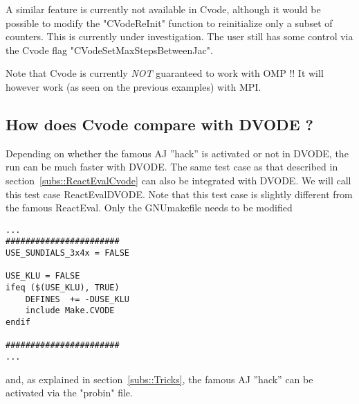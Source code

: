 \documentclass[12pt]{article}
\begin{document}
A similar feature is currently not available in Cvode, although it would be possible to modify the "CVodeReInit" function to reinitialize only a subset of counters. This is currently under investigation. The user still has some control via the Cvode flag "CVodeSetMaxStepsBetweenJac".

Note that Cvode is currently \textit{NOT} guaranteed to work with OMP !! It will however work (as seen on the previous examples) with MPI.

\subsection{How does Cvode compare with DVODE ?}
Depending on whether the famous AJ ''hack'' is activated or not in DVODE, the run can be much faster with DVODE. The same test case as that described in section~\ref{subs::ReactEvalCvode} can also be integrated with DVODE. We will call this test case ReactEvalDVODE. Note that this test case is slightly different from the famous ReactEval. Only the GNUmakefile needs to be modified
\begin{verbatim}
...
#######################
USE_SUNDIALS_3x4x = FALSE

USE_KLU = FALSE
ifeq ($(USE_KLU), TRUE)
    DEFINES  += -DUSE_KLU
    include Make.CVODE
endif

#######################
...
\end{verbatim}
and, as explained in section~\ref{subs::Tricks}, the famous AJ ''hack'' can be activated via the "probin" file.
\end{document}
